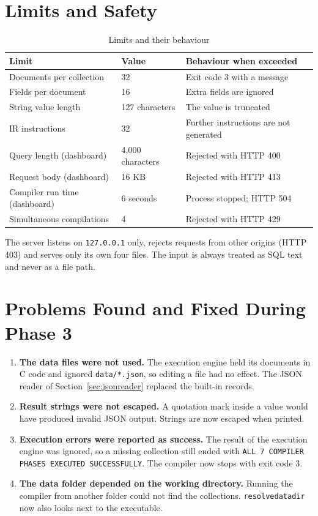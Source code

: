 \documentclass[12pt,a4paper]{report}
\newcommand{\codeus}{\textunderscore\allowbreak}
\DeclareRobustCommand{\code}[1]{\texttt{\let\_\codeus #1}}
\begin{document}
\section{Limits and Safety}
\begin{table}[H]
\centering\small
\begin{tabularx}{\linewidth}{|P{5.2cm}|P{2.2cm}|L|}
\hline
\textbf{Limit} & \textbf{Value} & \textbf{Behaviour when exceeded} \\ \hline
Documents per collection & 32 & Exit code 3 with a message \\ \hline
Fields per document & 16 & Extra fields are ignored \\ \hline
String value length & 127 characters & The value is truncated \\ \hline
IR instructions & 32 & Further instructions are not generated \\ \hline
Query length (dashboard) & 4,000 characters & Rejected with HTTP 400 \\ \hline
Request body (dashboard) & 16 KB & Rejected with HTTP 413 \\ \hline
Compiler run time (dashboard) & 6 seconds & Process stopped; HTTP 504 \\ \hline
Simultaneous compilations & 4 & Rejected with HTTP 429 \\ \hline
\end{tabularx}
\caption{Limits and their behaviour}
\end{table}
The server listens on \code{127.0.0.1} only, rejects requests from other origins (HTTP 403) and serves only its own four files. The input is always treated as SQL text and never as a file path.

\section{Problems Found and Fixed During Phase 3}
\begin{enumerate}
  \item \textbf{The data files were not used.} The execution engine held its documents in C code and ignored \code{data/*.json}, so editing a file had no effect. The JSON reader of Section~\ref{sec:jsonreader} replaced the built-in records.
  \item \textbf{Result strings were not escaped.} A quotation mark inside a value would have produced invalid JSON output. Strings are now escaped when printed.
  \item \textbf{Execution errors were reported as success.} The result of the execution engine was ignored, so a missing collection still ended with \code{ALL 7 COMPILER PHASES EXECUTED SUCCESSFULLY}. The compiler now stops with exit code 3.
  \item \textbf{The data folder depended on the working directory.} Running the compiler from another folder could not find the collections. \code{resolve\_data\_dir} now also looks next to the executable.
\end{enumerate}
\end{document}
